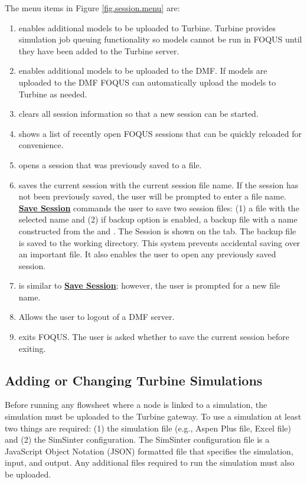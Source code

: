 The menu items in Figure \ref{fig.session.menu} are:
\begin{enumerate}
	\item {} enables additional models to be uploaded to Turbine. Turbine provides simulation job queuing functionality so models cannot be run in FOQUS until they have been added to the Turbine server.
	\item {} enables additional models to be uploaded to the DMF. If models are uploaded to the DMF FOQUS can automatically upload the models to Turbine as needed. 
	\item {} clears all session information so that a new session can be started.
	\item {} shows a list of recently open FOQUS sessions that can be quickly reloaded for convenience.
	\item {} opens a session that was previously saved to a file.
	\item {} saves the current session with the current session file name. If the session has not been previously saved, the user will be prompted to enter a file name. \textbf{\underline{Save Session}} commands the user to save two session files: (1) a file with the selected name and (2) if backup option is enabled, a backup file with a name constructed from the  and .  The Session  is shown on the  tab.  The backup file is saved to the working directory. This system prevents accidental saving over an important file. It also enables the user to open any previously saved session.
	\item {} is similar to \textbf{\underline{Save Session}}; however, the user is prompted for a new file name.
	\item {} Allows the user to logout of a DMF server.
	\item {} exits FOQUS. The user is asked whether to save the current session before exiting.
\end{enumerate}

\subsection{Adding or Changing Turbine Simulations}\label{overview.turbine.upload}

Before running any flowsheet where a node is linked to a simulation, the simulation must be uploaded to the Turbine gateway. To use a simulation at least two things are required: (1) the simulation file (e.g., Aspen Plus file, Excel file) and (2) the SimSinter configuration. The SimSinter configuration file is a JavaScript Object Notation (JSON) formatted file that specifies the simulation, input, and output. Any additional files required to run the simulation must also be uploaded.

